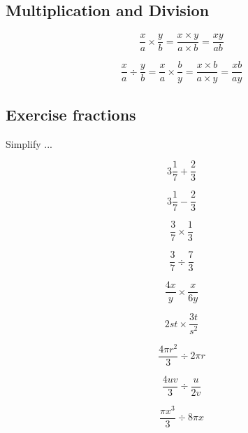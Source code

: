 \subsection{Multiplication and Division}

\begin{equation}
 \frac{x}{a} \times \frac{y}{b} = \frac{x \times y}{a \times b} = \frac{xy}{ab}
\end{equation}

\begin{equation}
 \frac{x}{a} \div \frac{y}{b} = \frac{x}{a} \times \frac{b}{y} = \frac{x \times b}{a \times y} = \frac{xb}{ay}
\end{equation}

\subsection{Exercise fractions}

Simplify ...

\begin{equation}
  3\frac{1}{7} + \frac{2}{3}
\end{equation}

\begin{equation}
  3\frac{1}{7} - \frac{2}{3}
\end{equation}

\begin{equation}
  \frac{3}{7} \times \frac{1}{3}
\end{equation}

\begin{equation}
  \frac{3}{7} \div \frac{7}{3}
\end{equation}

\begin{equation}
  \frac{4x}{y} \times \frac{x}{6y}
\end{equation}

\begin{equation}
  2st \times \frac{3t}{s^{2}}
\end{equation}

\begin{equation}
  \frac{4 \pi r^{2}}{3} \div 2 \pi r
\end{equation}

\begin{equation}
  \frac{4uv}{3} \div \frac{u}{2v}
\end{equation}

\begin{equation}
  \frac{\pi x^{3}}{3} \div 8 \pi x
\end{equation}

